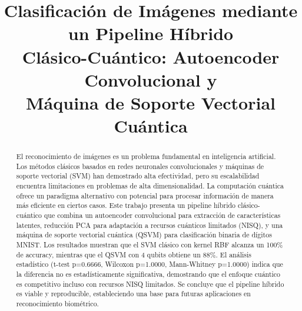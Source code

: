 \documentclass[conference]{IEEEtran}
\begin{document}
\title{Clasificación de Imágenes mediante un Pipeline Híbrido\\[0.2cm]
Clásico-Cuántico: Autoencoder Convolucional y\\[0.2cm]
Máquina de Soporte Vectorial Cuántica}

\author{
}

\maketitle

\begin{abstract}
El reconocimiento de imágenes es un problema fundamental en inteligencia artificial. 
Los métodos clásicos basados en redes neuronales convolucionales y máquinas de soporte 
vectorial (SVM) han demostrado alta efectividad, pero su escalabilidad encuentra 
limitaciones en problemas de alta dimensionalidad. La computación cuántica ofrece un 
paradigma alternativo con potencial para procesar información de manera más eficiente 
en ciertos casos. Este trabajo presenta un pipeline híbrido clásico-cuántico que 
combina un autoencoder convolucional para extracción de características latentes, 
reducción PCA para adaptación a recursos cuánticos limitados (NISQ), y una máquina 
de soporte vectorial cuántica (QSVM) para clasificación binaria de dígitos MNIST. 
Los resultados muestran que el SVM clásico con kernel RBF alcanza un 100\% de 
accuracy, mientras que el QSVM con 4 qubits obtiene un 88\%. El análisis estadístico 
(t-test p=0.6666, Wilcoxon p=1.0000, Mann-Whitney p=1.0000) indica que la diferencia 
no es estadísticamente significativa, demostrando que el enfoque cuántico es 
competitivo incluso con recursos NISQ limitados. Se concluye que el pipeline híbrido 
es viable y reproducible, estableciendo una base para futuras aplicaciones en 
reconocimiento biométrico.
\end{abstract}
\end{document}
